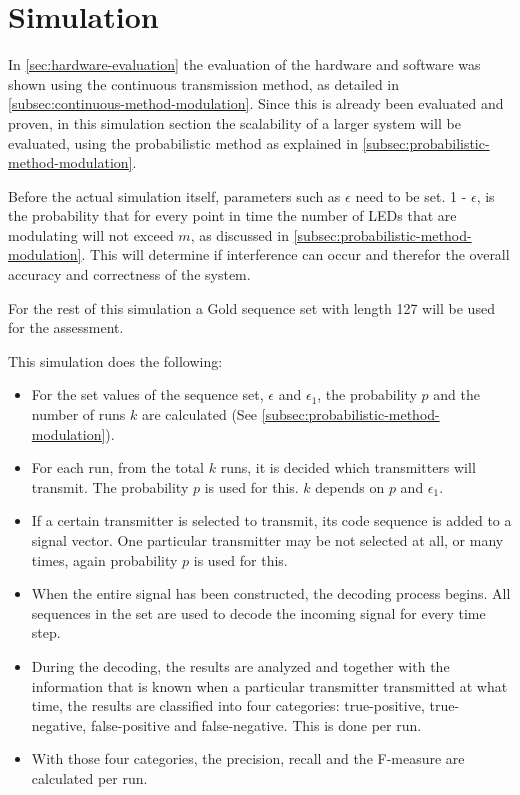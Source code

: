 
\section{Simulation}
\label{sec:simulation-evaluation}

In \autoref{sec:hardware-evaluation} the evaluation of the hardware and software was shown using the continuous transmission method, as detailed in \autoref{subsec:continuous-method-modulation}.
Since this is already been evaluated and proven, in this simulation section the scalability of a larger system will be evaluated, using the probabilistic method as explained in \autoref{subsec:probabilistic-method-modulation}.


Before the actual simulation itself, parameters such as $\epsilon$ need to be set.
1 - $\epsilon$, is the probability that for every point in time the number of LEDs that are modulating will not exceed $m$, as discussed in \autoref{subsec:probabilistic-method-modulation}.
This will determine if interference can occur and therefor the overall accuracy and correctness of the system.

For the rest of this simulation a Gold sequence set with length 127 will be used for the assessment.

This simulation does the following: 

\begin{itemize}

	\item For the set values of the sequence set, $\epsilon$ and $\epsilon_1$, the probability $p$ and the number of runs $k$ are calculated (See \autoref{subsec:probabilistic-method-modulation}).

	\item For each run, from the total $k$ runs, it is decided which transmitters will transmit. The probability $p$ is used for this. $k$ depends on $p$ and $\epsilon_1$.

	\item If a certain transmitter is selected to transmit, its code sequence is added to a signal vector. One particular transmitter may be not selected at all, or many times, again probability $p$ is used for this.

	\item When the entire signal has been constructed, the decoding process begins. All sequences in the set are used to decode the incoming signal for every time step.

	\item During the decoding, the results are analyzed and together with the information that is known when a particular transmitter transmitted at what time, the results are classified into four categories: true-positive, true-negative, false-positive and false-negative. This is done per run.

	\item With those four categories, the precision, recall and the F-measure are calculated per run.



\end{itemize}




